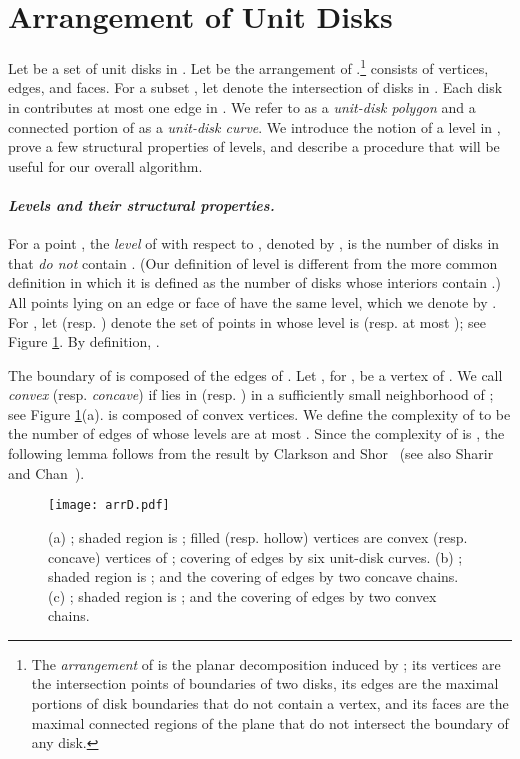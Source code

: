 \documentclass[11pt]{myclass}
\begin{document}
\section{Arrangement of Unit Disks}
\label{sec:arrangementD}
Let  be a set of  unit disks in .  Let  be the arrangement of .\footnote{The \emph{arrangement} of  is the planar decomposition induced by ; its vertices are the intersection points of boundaries of two disks, its edges are the maximal portions of disk boundaries that do not contain a vertex, and its faces are the maximal connected regions of the plane that do not intersect the boundary of any disk.}   consists of  vertices, edges, and faces.  For a subset , let  denote the intersection of disks in .  Each disk in  contributes at most one edge in .  We refer to  as a \emph{unit-disk polygon} and a connected portion of  as a \emph{unit-disk curve}.  
We introduce the notion of a level in , prove a few structural properties of levels, and describe a procedure that will be useful for our overall algorithm.  

\paragraph{\textbf{\emph{Levels and their structural properties.}}}
For a point , the \emph{level} of  with respect to , denoted by , is the number of disks in  that \emph{do not} contain .  (Our definition of level is different from the more common definition in which it is defined as the number of disks whose interiors contain .)  All points lying on an edge or face  of  have the same level, which we denote by .  For , let  (resp. ) denote the set of points in  whose level is  (resp. at most ); see Figure \ref{fig:arrD}.  By definition, .  

The boundary of  is composed of the edges of .  
Let , for , be a vertex of .  We call  \emph{convex} (resp. \emph{concave}) if  lies in  (resp. ) in a sufficiently small neighborhood of ; see Figure \ref{fig:arrD}(a).   is composed of convex vertices.
We define the complexity of  to be the number of edges of  whose levels are at most .  Since the complexity of  is , the following lemma follows from the result by Clarkson and Shor~\cite{CS89} (see also Sharir~\cite{Sha91} and Chan~\cite{Cha07}).  

\begin{figure}
  \centering
  \texttt{[image: arrD.pdf]}
\caption{\label{fig:arrD} 
\small (a) ; shaded region is ; filled (resp. hollow) vertices are convex (resp. concave) vertices of ; covering of  edges by six unit-disk curves.  
(b) ; shaded region is ; and the covering of  edges by two concave chains.
(c) ; shaded region is ; and the covering of  edges by two convex chains.}
\end{figure}
\end{document}
